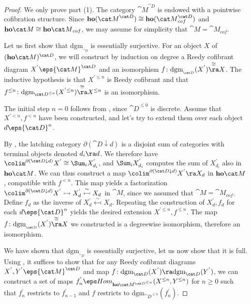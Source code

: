 \begin{proof}
We only prove part (1). The category ${\cat M}^{\cat D}$ is endowed with a pointwise cofibration structure. Since ${\bf ho}({\cat M}^{\cat D}) \cong {\bf ho}({\cat M}^{\cat D}_{cof})$ and ${\bf ho}{\cat M} \cong {\bf ho}{\cat M}_{cof}$, we may assume for simplicity that ${\cat M} = {\cat M}_{cof}$.

Let us first show that $\mathrm{dgm}_{_{\cat D}}$ is essentially surjective. For an object $X$ of $({\bf ho}{\cat M})^{\cat D}$, we will construct by induction on degree a Reedy cofibrant diagram $X^{'} \eps {\cat M}^{\cat D}$ and an isomorphism $f \colon \mathrm{dgm}_{_{\cat D}}(X^{'}) \overset{\cong}{\ra} X$. The inductive hypothesis is that $X^{' \le n}$ is Reedy cofibrant and that $f^{\le n} \colon \mathrm{dgm}_{{\cat D}^{\le n}}(X^{' \le n}) \overset{\cong}{\ra} X^{\le n}$ is an isomorphism.

The initial step $n = 0$ follows from , since ${\cat D}^{\le 0}$ is discrete. Assume that $X^{'<n}, f^{< n}$ have been constructed, and let's try to extend them over each object $d \eps {\cat D}^n$. 

By , the latching category $\partial({\cat D} \downarrow d)$ is a disjoint sum of categories with terminal objects denoted $d_i \ra d$. We therefore have $\colim^{\partial({\cat D} \downarrow d)} X^{'} \cong \Sum_i X^{'}_{d_i}$, and $\Sum_i X^{'}_{d_i}$ computes the sum of $X^{'}_{d_i}$ also in ${\bf ho}{\cat M}$. We can thus construct a map $\colim^{\partial({\cat D} \downarrow d)} X^{'} \ra X_d$ in ${\bf ho}{\cat M}$, compatible with $f^{< n}$. This map yields a factorization $\colim^{\partial({\cat D} \downarrow d)} X^{'} \rightarrowtail X^{'}_d \overset{\sim}{\leftarrowtail} X_d$ in ${\cat M}$, since we assumed that ${\cat M} = {\cat M}_{cof}$. Define $f_d$ as the inverse of $X^{'}_d \overset{\sim}{\leftarrowtail} X_d$. Repeating the construction of $X^{'}_d, f_d$ for each $d \eps {\cat D}^n$ yields the desired extension $X^{' \le n}, f^{\le n}$. The map $f \colon \mathrm{dgm}_{_{\cat D}}(X^{'}) \overset{\cong}{\ra} X$ we constructed is a degreewise isomorphism, therefore an isomorphism.

We have shown that $\mathrm{dgm}_{_{\cat D}}$ is essentially surjective, let us now show that it is full. Using , it suffices to show that for any Reedy cofibrant diagrams $X^{'}, Y^{'} \eps {\cat M}^{\cat D}$ and map $f \colon \mathrm{dgm}_{{{\cat D}}}(X^{'}) \ra \mathrm{dgm}_{{{\cat D}}}(Y^{'})$, we can construct a set of maps $f^{'}_n \eps Hom_{{\bf ho}{{\cat M}^{{\cat D}^{\le n}}}} (X^{\le n}, Y^{\le n})$ for $n \ge 0$ such that $f^{'}_{n}$ restricts to $f^{'}_{n-1}$ and $f$ restricts to $\mathrm{dgm}_{{\cat D}^{\le n}}(f^{'}_n)$.


\end{proof}

